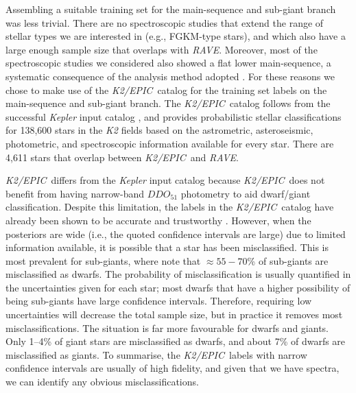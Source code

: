 \documentclass[preprint]{aastex}
\newcommand{\acronym}[1]{{\small{#1}}}
\newcommand{\project}[1]{\textsl{#1}}
\newcommand{\rave}{\project{\acronym{RAVE}}}
\newcommand{\epic}{\project{K2/EPIC}}
\begin{document}
Assembling a suitable training set for the main-sequence and sub-giant branch was less
trivial.  There are no spectroscopic studies that extend the range of stellar types we 
are interested in (e.g., FGKM-type stars), and which also have a large enough sample size 
that overlaps with \rave.  Moreover, most of the spectroscopic studies we considered also 
showed a flat lower main-sequence, a systematic consequence of the analysis method adopted 
\citep[see][for discussion on this issue]{Bensby_2014}.  For these reasons we chose to make 
use of the \epic\ catalog \citep{Huber_2016} for the training set labels on the 
main-sequence and sub-giant branch.  The \epic\ catalog follows from the successful
\project{Kepler} input catalog \citep{Brown_2011}, and provides probabilistic stellar 
classifications for 138,600 stars in the \project{K2} fields based on the 
astrometric, asteroseismic, photometric, and spectroscopic information available for
every star.  There are 4,611 stars that overlap between \epic\ and \rave.


\epic\ differs from the \project{Kepler} input catalog because \epic\ does not 
benefit from having narrow-band $DDO_{51}$ photometry to aid dwarf/giant 
classification.  Despite this limitation, the labels in the \epic\ catalog have 
already been shown to be accurate and trustworthy \citep{Huber_2016}.  However, 
when the posteriors are wide (i.e., the quoted confidence intervals are large) 
due to limited information available, it is possible that a star has been 
misclassified.  This is most prevalent for sub-giants, where \citet{Huber_2016} 
note that $\approx55-70$\% of sub-giants are misclassified as dwarfs.  The 
probability of misclassification is usually quantified in the uncertainties given
for each star; most dwarfs that have a higher possibility of being sub-giants have
large confidence intervals.  Therefore, requiring low uncertainties will decrease 
the total sample size, but in practice it removes most misclassifications.  The 
situation is far more favourable for dwarfs and giants.  Only 1--4\% of giant 
stars are misclassified as dwarfs, and about 7\% of dwarfs are misclassified as 
giants.  To summarise, the \epic\ labels with narrow confidence intervals are 
usually of high fidelity, and given that we have spectra, we can identify any
obvious misclassifications.
\end{document}
